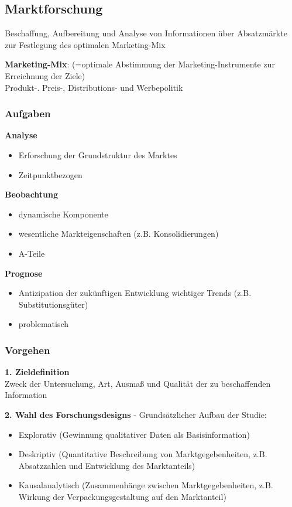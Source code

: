 \documentclass[a4paper,11pt, twoside]{article}
\newcommand\mpar[1]{\marginpar {\flushleft\small #1}}
\begin{document}
\subsection{Marktforschung}
Beschaffung, Aufbereitung und Analyse von Informationen über Absatzmärkte zur Festlegung des optimalen Marketing-Mix

\textbf{Marketing-Mix}: (=optimale Abstimmung der Marketing-Instrumente zur Erreichnung der Ziele)\\
Produkt-. Preis-, Distributions- und Werbepolitik

\subsubsection*{Aufgaben}

\textbf{Analyse}
\begin{itemize}
	\item Erforschung der Grundstruktur des Marktes
	\item Zeitpunktbezogen 
\end{itemize}

\textbf{Beobachtung}
\begin{itemize}
	\item dynamische Komponente
	\item wesentliche Markteigenschaften (z.B. Konsolidierungen)
	\item A-Teile 
\end{itemize}

\textbf{Prognose}
\begin{itemize}
	\item Antizipation der zukünftigen Entwicklung wichtiger Trends (z.B. Substitutionsgüter)
	\item problematisch
\end{itemize}

\subsubsection*{Vorgehen}
\textbf{1. Zieldefinition}\\
Zweck der Untersuchung, Art, Ausmaß und Qualität der zu beschaffenden Information

\textbf{2. Wahl des Forschungsdesigns} - Grundsätzlicher Aufbau der Studie:
\begin{itemize}
	\item Explorativ (Gewinnung qualitativer Daten als Basisinformation)
\mpar{\textcolor{red}{Beispiel: "`Welche Eigenschaften muß eine Kaffeesorte für ältere Menschen aufweisen?"'}}
	\item Deskriptiv (Quantitative Beschreibung von Marktgegebenheiten, z.B. Absatzzahlen und Entwicklung des Marktanteils)
	\item Kausalanalytisch (Zusammenhänge zwischen Marktgegebenheiten, z.B. Wirkung der Verpackungsgestaltung auf den Marktanteil)
\end{itemize}
\end{document}
